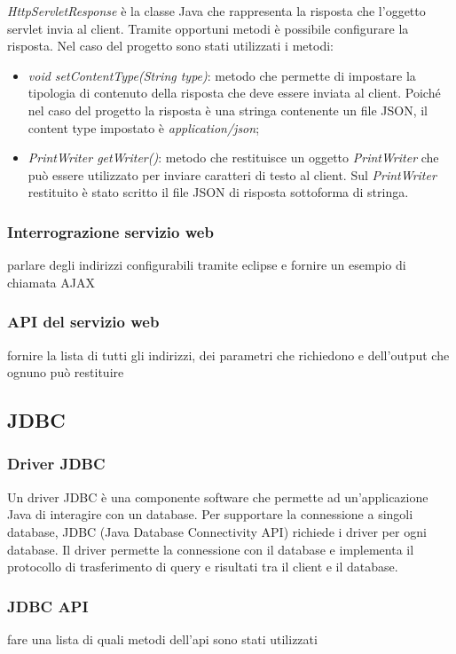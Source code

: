 \textit{HttpServletResponse} è la classe Java che rappresenta la risposta che l'oggetto servlet invia al client. Tramite opportuni metodi è possibile configurare la risposta. Nel caso del progetto sono stati utilizzati i metodi:
\begin{itemize}
	\item \textit{void setContentType(String type)}: metodo che permette di impostare la tipologia di contenuto della risposta che deve essere inviata al client. Poiché nel caso del progetto la risposta è una stringa contenente un file JSON, il content type impostato è \textit{application/json};
	\item \textit{PrintWriter getWriter()}: metodo che restituisce un oggetto \textit{PrintWriter} che può essere utilizzato per inviare caratteri di testo al client. Sul \textit{PrintWriter} restituito è stato scritto il file JSON di risposta sottoforma di stringa.
\end{itemize}

\subsubsection{Interrograzione servizio web}
parlare degli indirizzi configurabili tramite eclipse e fornire un esempio di chiamata AJAX

\subsubsection{API del servizio web}
fornire la lista di tutti gli indirizzi, dei parametri che richiedono e dell'output che ognuno può restituire

\subsection{JDBC}

\subsubsection{Driver JDBC}

Un driver JDBC è una componente software che permette ad un'applicazione Java di interagire con un database. Per supportare la connessione a singoli database, JDBC (Java Database Connectivity API) richiede i driver per ogni database. Il driver permette la connessione con il database e implementa il protocollo di trasferimento di query e risultati tra il client e il database.

\subsubsection{JDBC API}

fare una lista di quali metodi dell'api sono stati utilizzati
